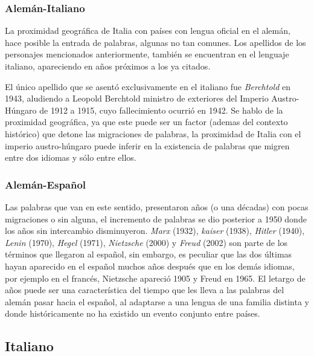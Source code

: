 \subsubsection*{Alemán-Italiano}

La proximidad geográfica de Italia con países con lengua oficial en el alemán, hace posible la entrada de palabras, algunas no tan comunes.  Los apellidos de los personajes mencionados anteriormente, también se encuentran en el lenguaje italiano, apareciendo en años próximos a los ya citados.  

El único apellido que se asentó exclusivamente en el  italiano fue \textit{Berchtold} en 1943, aludiendo a Leopold Berchtold ministro de exteriores del Imperio Austro-Húngaro de 1912 a 1915, cuyo fallecimiento ocurrió en 1942.  Se hablo de la proximidad geográfica, ya que este puede ser un factor (ademas del contexto histórico) que detone las migraciones de palabras, la proximidad de Italia con el imperio austro-húngaro puede inferir en la existencia de  palabras que migren entre  dos idiomas y sólo entre ellos. 

  
\subsubsection*{Alemán-Español}

Las palabras que van en este sentido,  presentaron años (o una décadas)  con pocas migraciones o sin alguna, el incremento de palabras se dio posterior a 1950 donde los años sin intercambio disminuyeron.  \textit{Marx} (1932), \textit{kaiser} (1938), \textit{Hitler} (1940), \textit{Lenin} (1970), \textit{Hegel} (1971),  \textit{Nietzsche} (2000) y \textit{Freud} (2002) son parte de los términos que llegaron al español,  sin embargo, es peculiar que las dos últimas hayan aparecido en el español muchos años después que en los demás idiomas, por ejemplo en el francés,  Nietzsche apareció 1905 y Freud en 1965. El letargo de años puede ser una característica del tiempo que les lleva  a las  palabras del alemán pasar hacia el español, al adaptarse a una lengua de una familia distinta y donde históricamente no ha existido un evento conjunto entre países. 



\newpage
\subsection{Italiano}

